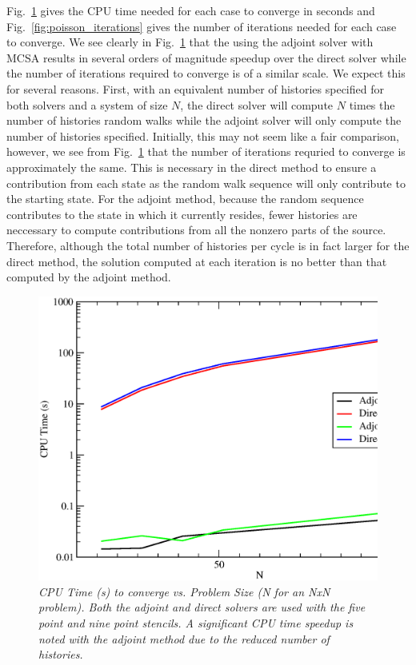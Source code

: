 \documentclass[preprint,12pt]{elsarticle}
\begin{document}
Fig.~\ref{fig:poisson_cpu_time} gives the CPU time needed for each case
to converge in seconds and Fig.~\ref{fig:poisson_iterations} gives the
number of iterations needed for each case to converge. We see clearly
in Fig.~\ref{fig:poisson_cpu_time} that the using the adjoint solver
with MCSA results in several orders of magnitude speedup over the
direct solver while the number of iterations required to converge is
of a similar scale. We expect this for several reasons. First, with an
equivalent number of histories specified for both solvers and a system
of size $N$, the direct solver will compute $N$ times the number of
histories random walks while the adjoint solver will only compute the
number of histories specified. Initially, this may not seem like a
fair comparison, however, we see from Fig.~\ref{fig:poisson_cpu_time}
that the number of iterations requried to converge is approximately
the same. This is necessary in the direct method to ensure a
contribution from each state as the random walk sequence will only
contribute to the starting state. For the adjoint method, because the
random sequence contributes to the state in which it currently
resides, fewer histories are neccessary to compute contributions from
all the nonzero parts of the source. Therefore, although the total
number of histories per cycle is in fact larger for the direct method,
the solution computed at each iteration is no better than that
computed by the adjoint method.

\begin{figure}[htpb!]
  \centering
  \includegraphics[width=5in,clip]{Adjoint_Direct_CPU_Time.eps}
  \caption{\sl CPU Time (s) to converge vs. Problem Size (N for an NxN
    problem). Both the adjoint and direct solvers are used with the
    five point and nine point stencils. A significant CPU time speedup
    is noted with the adjoint method due to the reduced number of
    histories.}
  \label{fig:poisson_cpu_time}
\end{figure}
\end{document}

